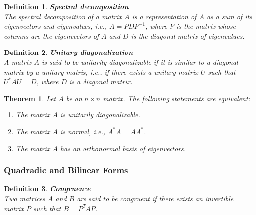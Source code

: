 \documentclass[11pt]{book} %
\newtheorem{theorem}{Theorem}[section]
\newtheorem{definition}{Definition}[section]
\begin{document}
\begin{definition}{\textbf{Spectral decomposition}} \\
    The spectral decomposition of a matrix \( A \) is a representation of \( A \) as a sum of its eigenvectors and eigenvalues, i.e., 
    \( A = PDP^{-1} \), where \( P \) is the matrix whose columns are the eigenvectors of \( A \) and \( D \) is the diagonal matrix of eigenvalues.
\end{definition}

\begin{definition}{\textbf{Unitary diagonalization}} \\
    A matrix \( A \) is said to be unitarily diagonalizable if it is similar to a diagonal matrix by a unitary matrix, i.e., 
    if there exists a unitary matrix \( U \) such that \( U^* A U = D \), where \( D \) is a diagonal matrix.
\end{definition}

\begin{theorem}
    Let \( A \) be an \( n \times n \) matrix. The following statements are equivalent:
    \begin{enumerate}
        \item The matrix \( A \) is unitarily diagonalizable.
        \item The matrix \( A \) is normal, i.e., \( A^* A = A A^* \).
        \item The matrix \( A \) has an orthonormal basis of eigenvectors.
    \end{enumerate}
\end{theorem} 



\subsubsection{Quadradic and Bilinear Forms}

\begin{definition}{\textbf{Congruence}} \\
    Two matrices \( A \) and \( B \) are said to be congruent if there exists an invertible matrix \( P \) such that \( B = P^T A P \).
\end{definition}
\end{document}
